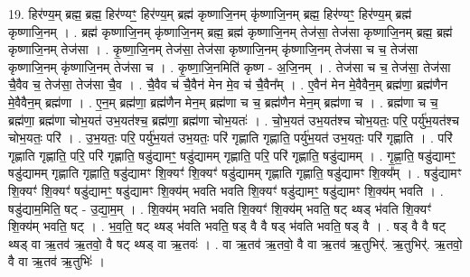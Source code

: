 \documentclass[17pt]{extarticle}
\begin{document}
19. हिर॑ण्य॒म् ब्रह्म॒ ब्रह्म॒ हिर॑ण्यꣳ॒॒ हिर॑ण्य॒म् ब्रह्म॑ कृष्णाजि॒नम् कृ॑ष्णाजि॒नम् ब्रह्म॒ हिर॑ण्यꣳ॒॒ हिर॑ण्य॒म् ब्रह्म॑ कृष्णाजि॒नम् । . ब्रह्म॑ कृष्णाजि॒नम् कृ॑ष्णाजि॒नम् ब्रह्म॒ ब्रह्म॑ कृष्णाजि॒नम् तेज॑सा॒ तेज॑सा कृष्णाजि॒नम् ब्रह्म॒ ब्रह्म॑ कृष्णाजि॒नम् तेज॑सा । . कृ॒ष्णा॒जि॒नम् तेज॑सा॒ तेज॑सा कृष्णाजि॒नम् कृ॑ष्णाजि॒नम् तेज॑सा च च॒ तेज॑सा कृष्णाजि॒नम् कृ॑ष्णाजि॒नम् तेज॑सा च । . कृ॒ष्णा॒जि॒नमिति॑ कृष्ण - अ॒जि॒नम् । . तेज॑सा च च॒ तेज॑सा॒ तेज॑सा चै॒वैव च॒ तेज॑सा॒ तेज॑सा चै॒व । . चै॒वैव च॑ चै॒वैन॑ मेन मे॒व च॑ चै॒वैन᳚म् । . ए॒वैन॑ मेन मे॒वैवैन॒म् ब्रह्म॑णा॒ ब्रह्म॑णैन मे॒वैवैन॒म् ब्रह्म॑णा । . ए॒न॒म् ब्रह्म॑णा॒ ब्रह्म॑णैन मेन॒म् ब्रह्म॑णा च च॒ ब्रह्म॑णैन मेन॒म् ब्रह्म॑णा च । . ब्रह्म॑णा च च॒ ब्रह्म॑णा॒ ब्रह्म॑णा चोभ॒यत॑ उभ॒यत॑श्च॒ ब्रह्म॑णा॒ ब्रह्म॑णा चोभ॒यतः॑ । . चो॒भ॒यत॑ उभ॒यत॑श्च चोभ॒यतः॒ परि॒ पर्यु॑भ॒यत॑श्च चोभ॒यतः॒ परि॑ । . उ॒भ॒यतः॒ परि॒ पर्यु॑भ॒यत॑ उभ॒यतः॒ परि॑ गृह्णाति गृह्णाति॒ पर्यु॑भ॒यत॑ उभ॒यतः॒ परि॑ गृह्णाति । . परि॑ गृह्णाति गृह्णाति॒ परि॒ परि॑ गृह्णाति॒ षडु॑द्यामꣳ॒॒ षडु॑द्यामम् गृह्णाति॒ परि॒ परि॑ गृह्णाति॒ षडु॑द्यामम् । . गृ॒ह्णा॒ति॒ षडु॑द्यामꣳ॒॒ षडु॑द्यामम् गृह्णाति गृह्णाति॒ षडु॑द्यामꣳ शि॒क्यꣳ॑ शि॒क्यꣳ॑ षडु॑द्यामम् गृह्णाति गृह्णाति॒ षडु॑द्यामꣳ शि॒क्य᳚म् । . षडु॑द्यामꣳ शि॒क्यꣳ॑ शि॒क्यꣳ॑ षडु॑द्यामꣳ॒॒ षडु॑द्यामꣳ शि॒क्य॑म् भवति भवति शि॒क्यꣳ॑ षडु॑द्यामꣳ॒॒ षडु॑द्यामꣳ शि॒क्य॑म् भवति । . षडु॑द्याम॒मिति॒ षट् - उ॒द्या॒म॒म् । . शि॒क्य॑म् भवति भवति शि॒क्यꣳ॑ शि॒क्य॑म् भवति॒ षट् थ्षड् भ॑वति शि॒क्यꣳ॑ शि॒क्य॑म् भवति॒ षट् । . भ॒व॒ति॒ षट् थ्षड् भ॑वति भवति॒ षड् वै वै षड् भ॑वति भवति॒ षड् वै । . षड् वै वै षट् थ्षड् वा ऋ॒तव॑ ऋ॒तवो॒ वै षट् थ्षड् वा ऋ॒तवः॑ । . वा ऋ॒तव॑ ऋ॒तवो॒ वै वा ऋ॒तव॑ ऋ॒तुभिर्॑. ऋ॒तुभिर्॑. ऋ॒तवो॒ वै वा ऋ॒तव॑ ऋ॒तुभिः॑ । \newline
\end{document}
